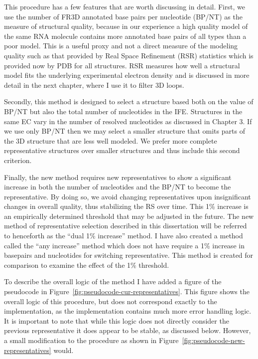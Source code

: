 This procedure has a few features that are worth discussing in detail. First, we
use the number of FR3D annotated base pairs per nucleotide (BP/NT) as the
measure of structural quality, because in our experience a high quality model of
the same RNA molecule contains more annotated base pairs of all types than a
poor model. This is a useful proxy and not a direct measure of the modeling
quality such as that provided by Real Space Refinement (RSR) statistics which is
provided now by PDB for all structures. RSR measures how well a structural model
fits the underlying experimental electron density and is discussed in more
detail in the next chapter, where I use it to filter 3D loops.

Secondly, this method is designed to select a structure based both on the value
of BP/NT but also the total number of nucleotides in the IFE. Structures in the
same EC vary in the number of resolved nucleotides as discussed in Chapter 3. If
we use only BP/NT then we may select a  smaller structure that omits parts of
the 3D structure that are less well modeled. We prefer more complete
representative structures over smaller structures and thus include this second
criterion.

Finally, the new method requires new representatives to show a significant
increase in both the number of nucleotides and the BP/NT to become the
representative. By doing so, we avoid changing representatives upon
insignificant changes in overall quality, thus stabilizing the RS over time.
This 1\% increase is an empirically determined threshold that may be adjusted in
the future. The new method of representative selection described in this
dissertation will be referred to henceforth as the ``dual 1\% increase'' method.
I have also created a method called the ``any increase'' method which does not
have require a 1\% increase in basepairs and nucleotides for switching
representative. This method is created for comparison to examine the effect of
the 1\% threshold.

To describe the overall logic of the method I have added a figure of the
pseudocode in Figure~\ref{fig:pseudocode-cur-representatives}. This figure shows
the overall logic of this procedure, but does not correspond exactly to the
implementation, as the implementation contains much more error handling logic.
It is important to note that while this logic does not directly consider the
previous representative it does appear to be stable, as discussed below.
However, a small modification to the procedure as shown in
Figure~\ref{fig:pseudocode-new-representatives} would.

